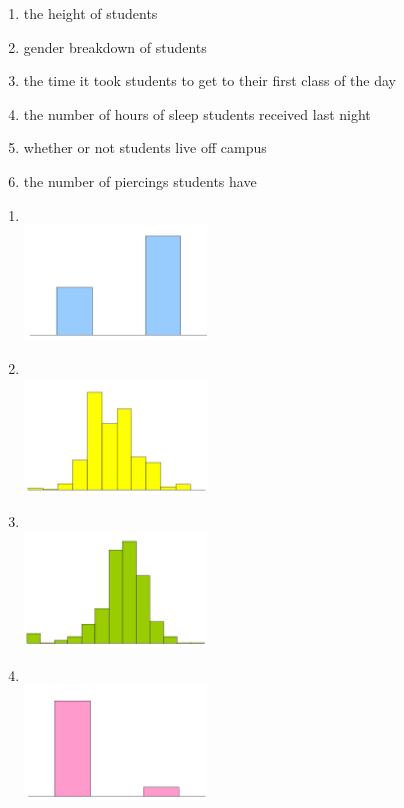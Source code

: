 \documentclass[11pt]{article}
\begin{document}
\begin{enumerate}
\begin{multicols}{2}
\begin{enumerate}
\item the height of students
\item gender breakdown of students
\item the time it took students to get to their first class of the day
\item the number of hours of sleep students received last night
\item whether or not students live off campus
\item the number of piercings students have
\end{enumerate}
\end{multicols}


\begin{multicols}{3}

\begin{enumerate}[(1)]

\item $\:$ \\
\includegraphics[height=1.2in]{gender}

\item $\:$ \\
\includegraphics[height=1.2in]{height}

\item $\:$ \\
\includegraphics[height=1.2in]{sleep}

\item $\:$ \\
\includegraphics[height=1.2in]{off_campus}


\end{enumerate}
\end{multicols}
\end{enumerate}
\end{document}
